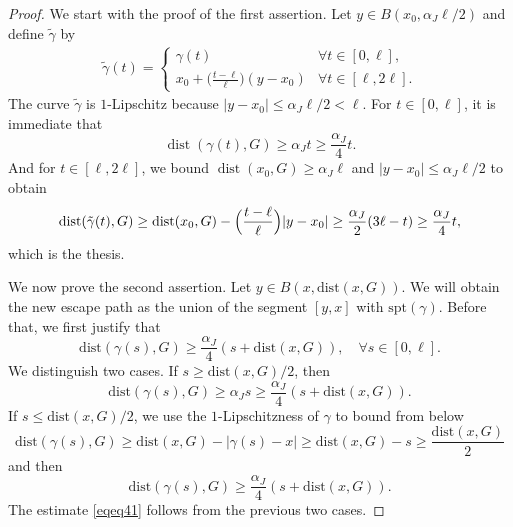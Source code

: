 \documentclass[12pt]{article}
\theoremstyle{definition}
\theoremstyle{remark}
\numberwithin{equation}{section}
\DeclareMathOperator{\dist}{dist}
\newcommand{\abs}[1]{\lvert #1 \rvert}
\begin{document}
\begin{proof}  We start with the proof of the first assertion. Let $y \in B(x_0, \alpha_J \ell/2)$ and define $\tilde{\gamma}$ by
    \begin{align*}
        \tilde{\gamma}(t)=
        \begin{cases}
            \gamma(t)                                        &\forall t\in[0,\ell],\\
            x_0 + \bigl(\frac{t - \ell}{\ell}\bigr) (y-x_0)  &\forall t\in[\ell,2\ell].
        \end{cases}
    \end{align*}
    The curve $\tilde{\gamma}$ is $1$-Lipschitz because $\abs{y - x_0} \leq \alpha_J \ell / 2 < \ell$.
    For $t\in[0,\ell]$, it is immediate that 
    \begin{equation} 
        \dist(\gamma(t),G)\geq \alpha_J t \geq \frac{\alpha_J}{4} t.
    \end{equation}
    And for $t\in [\ell,2\ell]$, we bound $\dist(x_0,G) \geq \alpha_J \ell$ and $\abs{y - x_0} \leq \alpha_J \ell/2$ to obtain
    \begin{align*}
        \dist(\tilde{\gamma}(t),G)\geq \dist(x_0,G) - \Bigl(\frac{t-\ell}{\ell}\Bigr)|y-x_0|\geq
        \frac{\alpha_J}{2}(3\ell - t) \geq \frac{\alpha_J}{4}t,
    \end{align*}
    which is the thesis. 

    \medskip


    We now prove the second assertion. Let $y\in B(x,\mathrm{dist}(x,G))$. We will obtain the new escape path as  the
    union of the segment $[y,x]$ with $\mathrm{spt}(\gamma)$. Before that, we first justify that 
    \begin{equation}
        \label{eqeq41}
        \mathrm{dist}(\gamma(s),G)\geq\frac{\alpha_J}{4}(s+\mathrm{dist}(x,G)),\quad\forall s\in[0,\ell].
    \end{equation}
    We distinguish two cases. If $s\geq \mathrm{dist}(x,G)/2$, then 
    \begin{equation}
        \mathrm{dist}(\gamma(s),G)\geq\alpha_Js \geq \frac{\alpha_J}{4}(s+\mathrm{dist}(x,G)).
    \end{equation}
    If $s \leq \mathrm{dist}(x,G)/2$, we use the $1$-Lipschitzness of $\gamma$ to bound from below
    \begin{equation}
        \mathrm{dist}(\gamma(s),G)
        \geq \mathrm{dist}(x,G)-|\gamma(s)-x|
        \geq \mathrm{dist}(x,G)-s \geq \frac{\mathrm{dist}(x,G)}{2}
    \end{equation}
    and then
    \begin{equation}
        \mathrm{dist}(\gamma(s),G)
        \geq \frac{\alpha_J}{4}(s+\mathrm{dist}(x,G)).
    \end{equation}
    The estimate \eqref{eqeq41} follows from the previous two cases.


\end{proof}
\end{document}
